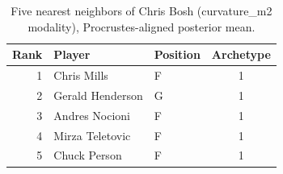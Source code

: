 \begin{table}[htbp]
  \centering\small
  \begin{tabular}{rllc}
    \toprule
    Rank & Player & Position & Archetype \\
    \midrule
    1 & Chris Mills & F & 1 \\
    2 & Gerald Henderson & G & 1 \\
    3 & Andres Nocioni & F & 1 \\
    4 & Mirza Teletovic & F & 1 \\
    5 & Chuck Person & F & 1 \\
    \bottomrule
  \end{tabular}
  \caption{Five nearest neighbors of Chris Bosh (curvature_m2 modality), Procrustes-aligned posterior mean.}
  \label{tab:Chris_Bosh_neighbors_curvature_m2}
\end{table}

